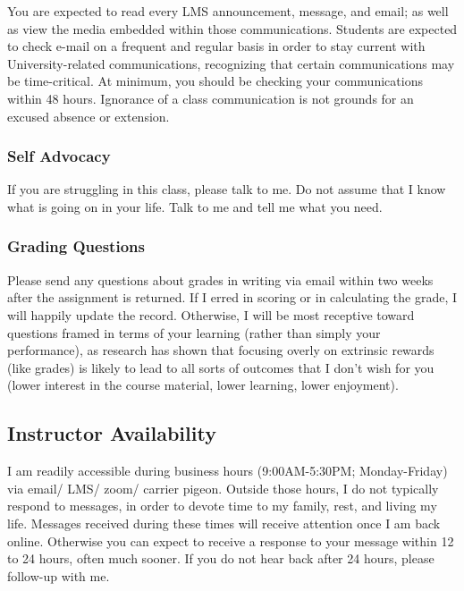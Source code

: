 \documentclass[11pt,]{article}
\begin{document}
You are expected to read every LMS announcement, message, and email; as
well as view the media embedded within those communications. Students
are expected to check e-mail on a frequent and regular basis in order to
stay current with University-related communications, recognizing that
certain communications may be time-critical. At minimum, you should be
checking your communications within 48 hours. Ignorance of a class
communication is not grounds for an excused absence or extension.

\hypertarget{self-advocacy}{%
\subsubsection{Self Advocacy}\label{self-advocacy}}

If you are struggling in this class, please talk to me. Do not assume
that I know what is going on in your life. Talk to me and tell me what
you need.

\hypertarget{grading-questions}{%
\subsubsection{Grading Questions}\label{grading-questions}}

Please send any questions about grades in writing via email within two
weeks after the assignment is returned. If I erred in scoring or in
calculating the grade, I will happily update the record. Otherwise, I
will be most receptive toward questions framed in terms of your learning
(rather than simply your performance), as research has shown that
focusing overly on extrinsic rewards (like grades) is likely to lead to
all sorts of outcomes that I don't wish for you (lower interest in the
course material, lower learning, lower enjoyment).

\hypertarget{instructor-availability}{%
\subsection{Instructor Availability}\label{instructor-availability}}

I am readily accessible during business hours (9:00AM-5:30PM;
Monday-Friday) via email/ LMS/ zoom/ carrier pigeon. Outside those
hours, I do not typically respond to messages, in order to devote time
to my family, rest, and living my life. Messages received during these
times will receive attention once I am back online. Otherwise you can
expect to receive a response to your message within 12 to 24 hours,
often much sooner. If you do not hear back after 24 hours, please
follow-up with me.
\end{document}

